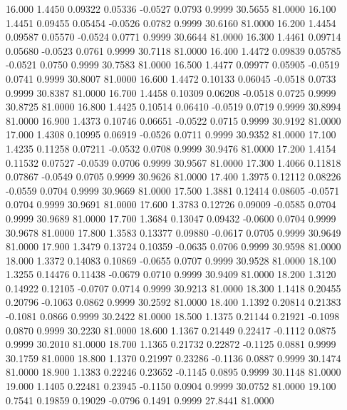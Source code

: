   16.000   1.4450   0.09322   0.05336  -0.0527   0.0793   0.9999  30.5655  81.0000
  16.100   1.4451   0.09455   0.05454  -0.0526   0.0782   0.9999  30.6160  81.0000
  16.200   1.4454   0.09587   0.05570  -0.0524   0.0771   0.9999  30.6644  81.0000
  16.300   1.4461   0.09714   0.05680  -0.0523   0.0761   0.9999  30.7118  81.0000
  16.400   1.4472   0.09839   0.05785  -0.0521   0.0750   0.9999  30.7583  81.0000
  16.500   1.4477   0.09977   0.05905  -0.0519   0.0741   0.9999  30.8007  81.0000
  16.600   1.4472   0.10133   0.06045  -0.0518   0.0733   0.9999  30.8387  81.0000
  16.700   1.4458   0.10309   0.06208  -0.0518   0.0725   0.9999  30.8725  81.0000
  16.800   1.4425   0.10514   0.06410  -0.0519   0.0719   0.9999  30.8994  81.0000
  16.900   1.4373   0.10746   0.06651  -0.0522   0.0715   0.9999  30.9192  81.0000
  17.000   1.4308   0.10995   0.06919  -0.0526   0.0711   0.9999  30.9352  81.0000
  17.100   1.4235   0.11258   0.07211  -0.0532   0.0708   0.9999  30.9476  81.0000
  17.200   1.4154   0.11532   0.07527  -0.0539   0.0706   0.9999  30.9567  81.0000
  17.300   1.4066   0.11818   0.07867  -0.0549   0.0705   0.9999  30.9626  81.0000
  17.400   1.3975   0.12112   0.08226  -0.0559   0.0704   0.9999  30.9669  81.0000
  17.500   1.3881   0.12414   0.08605  -0.0571   0.0704   0.9999  30.9691  81.0000
  17.600   1.3783   0.12726   0.09009  -0.0585   0.0704   0.9999  30.9689  81.0000
  17.700   1.3684   0.13047   0.09432  -0.0600   0.0704   0.9999  30.9678  81.0000
  17.800   1.3583   0.13377   0.09880  -0.0617   0.0705   0.9999  30.9649  81.0000
  17.900   1.3479   0.13724   0.10359  -0.0635   0.0706   0.9999  30.9598  81.0000
  18.000   1.3372   0.14083   0.10869  -0.0655   0.0707   0.9999  30.9528  81.0000
  18.100   1.3255   0.14476   0.11438  -0.0679   0.0710   0.9999  30.9409  81.0000
  18.200   1.3120   0.14922   0.12105  -0.0707   0.0714   0.9999  30.9213  81.0000
  18.300   1.1418   0.20455   0.20796  -0.1063   0.0862   0.9999  30.2592  81.0000
  18.400   1.1392   0.20814   0.21383  -0.1081   0.0866   0.9999  30.2422  81.0000
  18.500   1.1375   0.21144   0.21921  -0.1098   0.0870   0.9999  30.2230  81.0000
  18.600   1.1367   0.21449   0.22417  -0.1112   0.0875   0.9999  30.2010  81.0000
  18.700   1.1365   0.21732   0.22872  -0.1125   0.0881   0.9999  30.1759  81.0000
  18.800   1.1370   0.21997   0.23286  -0.1136   0.0887   0.9999  30.1474  81.0000
  18.900   1.1383   0.22246   0.23652  -0.1145   0.0895   0.9999  30.1148  81.0000
  19.000   1.1405   0.22481   0.23945  -0.1150   0.0904   0.9999  30.0752  81.0000
  19.100   0.7541   0.19859   0.19029  -0.0796   0.1491   0.9999  27.8441  81.0000
